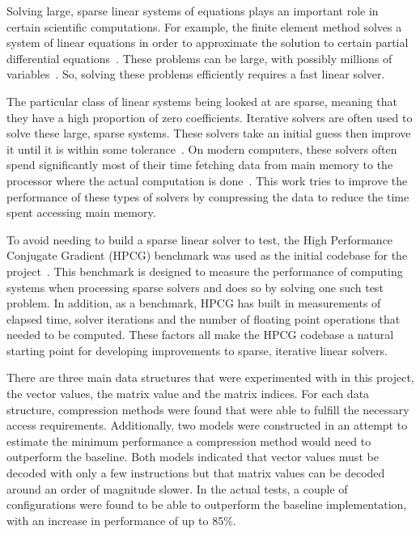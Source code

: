 Solving large, sparse linear systems of equations plays an important role in certain scientific computations.
For example, the finite element method solves a system of linear equations in order to approximate the solution to certain partial differential equations~\cite{Saad:2003:IterativeMethods}.
These problems can be large, with possibly millions of variables~\cite{Davis:2011:FloridaMatrixCollection}.
So, solving these problems efficiently requires a fast linear solver.

The particular class of linear systems being looked at are sparse, meaning that they have a high proportion of zero coefficients.
Iterative solvers are often used to solve these large, sparse systems.
These solvers take an initial guess then improve it until it is within some tolerance~\cite{Saad:2003:IterativeMethods}.
On modern computers, these solvers often spend significantly most of their time fetching data from main memory to the processor where the actual computation is done~\cite{Lawlor:2013:compression}.
This work tries to improve the performance of these types of solvers by compressing the data to reduce the time spent accessing main memory.

To avoid needing to build a sparse linear solver to test, the High Performance Conjugate Gradient (HPCG) benchmark was used as the initial codebase for the project~\cite{Dongarra:2015:HPCG}.
This benchmark is designed to measure the performance of computing systems when processing sparse solvers and does so by solving one such test problem.
In addition, as a benchmark, HPCG has built in measurements of elapsed time, solver iterations and the number of floating point operations that needed to be computed.
These factors all make the HPCG codebase a natural starting point for developing improvements to sparse, iterative linear solvers.

There are three main data structures that were experimented with in this project, the vector values, the matrix value and the matrix indices.
For each data structure, compression methods were found that were able to fulfill the necessary access requirements.
Additionally, two models were constructed in an attempt to estimate the minimum performance a compression method would need to outperform the baseline.
Both models indicated that vector values must be decoded with only a few instructions but that matrix values can be decoded around an order of magnitude slower.
In the actual tests, a couple of configurations were found to be able to outperform the baseline implementation, with an increase in performance of up to 85\%.

